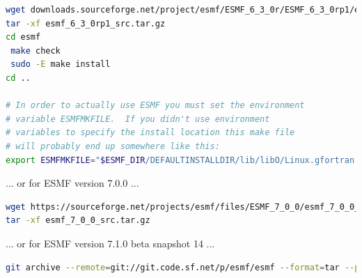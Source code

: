 \documentclass[11pt]{article}
\begin{document}
\begin{lstlisting}[language=bash]
wget downloads.sourceforge.net/project/esmf/ESMF_6_3_0r/ESMF_6_3_0rp1/esmf_6_3_0rp1_src.tar.gz
tar -xf esmf_6_3_0rp1_src.tar.gz
cd esmf 
 make check
 sudo -E make install
cd ..

# In order to actually use ESMF you must set the environment 
# variable ESMFMKFILE.  If you didn't use environment 
# variables to specify the install location this make file 
# will probably end up somewhere like this:
export ESMFMKFILE="$ESMF_DIR/DEFAULTINSTALLDIR/lib/libO/Linux.gfortran.64.openmpi.default/esmf.mk"

\end{lstlisting}
\vspace{10mm}
... or for ESMF version 7.0.0 ...
\begin{lstlisting}[language=bash]
wget https://sourceforge.net/projects/esmf/files/ESMF_7_0_0/esmf_7_0_0_src.tar.gz
tar -xf esmf_7_0_0_src.tar.gz 
\end{lstlisting}
\vspace{10mm}
... or for ESMF version 7.1.0 beta snapshot 14 ...
\begin{lstlisting}[language=bash]
git archive --remote=git://git.code.sf.net/p/esmf/esmf --format=tar --prefix=esmf/ ESMF_7_1_0_beta_snapshot_14 | tar xf -
\end{lstlisting}
\end{document}
